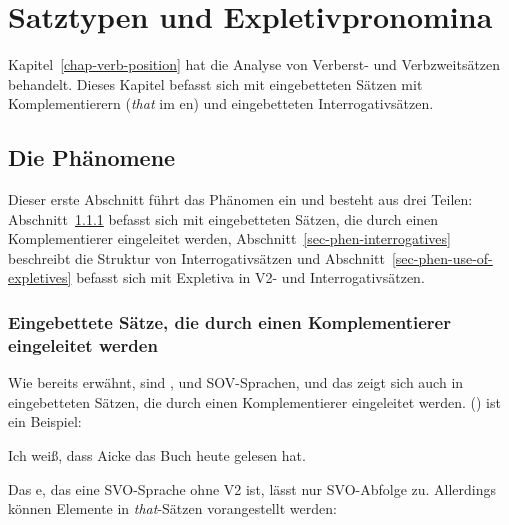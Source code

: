 \chapter{Satztypen und Expletivpronomina}
\label{chap-expletives}


Kapitel~\ref{chap-verb-position} hat die Analyse von Verberst- und Verbzweitsätzen behandelt. Dieses Kapitel befasst sich
mit eingebetteten Sätzen mit Komplementierern (\zb \emph{that} im en) und eingebetteten Interrogativsätzen.

\section{Die Phänomene}

Dieser erste Abschnitt führt das Phänomen ein und besteht aus drei Teilen: Abschnitt~\ref{sec-complementizer} befasst sich mit eingebetteten
Sätzen, die durch einen Komplementierer eingeleitet werden, Abschnitt~\ref{sec-phen-interrogatives} beschreibt die
Struktur von Interrogativsätzen und Abschnitt~\ref{sec-phen-use-of-expletives} befasst sich mit Expletiva in V2- und Interrogativsätzen.

\subsection{Eingebettete Sätze, die durch einen Komplementierer eingeleitet werden}
\label{sec-complementizer}

Wie bereits erwähnt, sind ,  und  SOV-Sprachen, und das zeigt sich auch in eingebetteten
Sätzen, die durch einen Komplementierer eingeleitet werden. () ist ein Beispiel:

\ea Ich weiß, dass Aicke das Buch heute gelesen hat. \z


\noindent
Das e, das eine SVO-Sprache ohne V2 ist, lässt nur SVO-Abfolge zu.
\z
Allerdings können Elemente in \emph{that}-Sätzen vorangestellt werden:
\eal
{}
\zl


